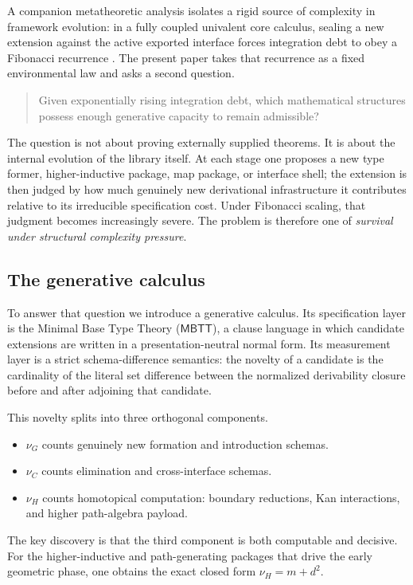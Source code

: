 \documentclass{lmcs}
\newcommand{\MBTT}{\mathsf{MBTT}}
\begin{document}
A companion metatheoretic analysis isolates a rigid source of complexity in framework evolution: in a fully coupled univalent core calculus, sealing a new extension against the active exported interface forces integration debt to obey a Fibonacci recurrence \cite{lande-companion}. The present paper takes that recurrence as a fixed environmental law and asks a second question.

\begin{quote}
Given exponentially rising integration debt, which mathematical structures possess enough generative capacity to remain admissible?
\end{quote}

The question is not about proving externally supplied theorems. It is about the internal evolution of the library itself. At each stage one proposes a new type former, higher-inductive package, map package, or interface shell; the extension is then judged by how much genuinely new derivational infrastructure it contributes relative to its irreducible specification cost. Under Fibonacci scaling, that judgment becomes increasingly severe. The problem is therefore one of \emph{survival under structural complexity pressure}.

\subsection{The generative calculus}

To answer that question we introduce a generative calculus. Its specification layer is the Minimal Base Type Theory ($\MBTT$), a clause language in which candidate extensions are written in a presentation-neutral normal form. Its measurement layer is a strict schema-difference semantics: the novelty of a candidate is the cardinality of the literal set difference between the normalized derivability closure before and after adjoining that candidate.

This novelty splits into three orthogonal components.
\begin{itemize}
    \item $\nu_G$ counts genuinely new formation and introduction schemas.
    \item $\nu_C$ counts elimination and cross-interface schemas.
    \item $\nu_H$ counts homotopical computation: boundary reductions, Kan interactions, and higher path-algebra payload.
\end{itemize}
The key discovery is that the third component is both computable and decisive. For the higher-inductive and path-generating packages that drive the early geometric phase, one obtains the exact closed form $\nu_H = m + d^2$.
\end{document}

